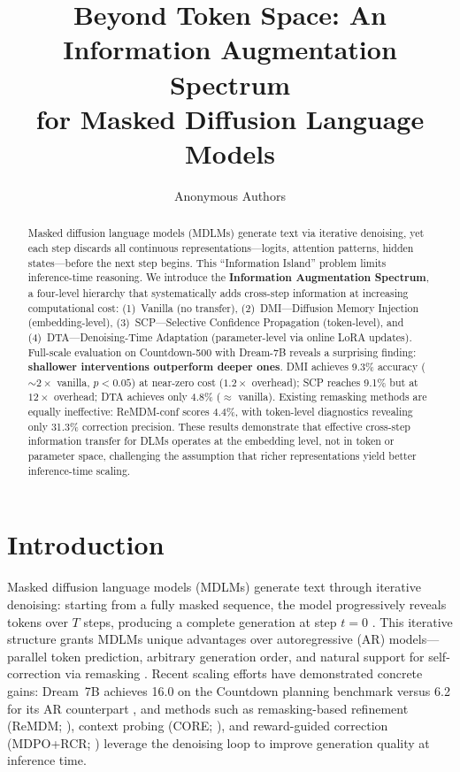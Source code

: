 \documentclass{article}
\title{Beyond Token Space: An Information Augmentation Spectrum\\for Masked Diffusion Language Models}
\author{
  Anonymous Authors
}
\begin{document}
\maketitle

\begin{abstract}
Masked diffusion language models (MDLMs) generate text via iterative denoising, yet each step discards all continuous representations---logits, attention patterns, hidden states---before the next step begins.
This ``Information Island'' problem limits inference-time reasoning.
We introduce the \textbf{Information Augmentation Spectrum}, a four-level hierarchy that systematically adds cross-step information at increasing computational cost:
(1)~Vanilla (no transfer),
(2)~DMI---Diffusion Memory Injection (embedding-level),
(3)~SCP---Selective Confidence Propagation (token-level), and
(4)~DTA---Denoising-Time Adaptation (parameter-level via online LoRA updates).
Full-scale evaluation on Countdown-500 with Dream-7B reveals a surprising finding: \textbf{shallower interventions outperform deeper ones}.
DMI achieves 9.3\% accuracy (${\sim}2{\times}$ vanilla, $p < 0.05$) at near-zero cost ($1.2{\times}$ overhead);
SCP reaches 9.1\% but at $12{\times}$ overhead;
DTA achieves only 4.8\% ($\approx$ vanilla).
Existing remasking methods are equally ineffective: ReMDM-conf scores 4.4\%, with token-level diagnostics revealing only 31.3\% correction precision.
These results demonstrate that effective cross-step information transfer for DLMs operates at the embedding level, not in token or parameter space, challenging the assumption that richer representations yield better inference-time scaling.
\end{abstract}

\section{Introduction}
\label{sec:intro}

Masked diffusion language models (MDLMs) generate text through iterative denoising: starting from a fully masked sequence, the model progressively reveals tokens over $T$ steps, producing a complete generation at step $t = 0$ \citep{sahoo2024mdlm, nie2025llada, dream2025}. This iterative structure grants MDLMs unique advantages over autoregressive (AR) models---parallel token prediction, arbitrary generation order, and natural support for self-correction via remasking \citep{wang2025remdm, core2026}. Recent scaling efforts have demonstrated concrete gains: Dream~7B achieves 16.0 on the Countdown planning benchmark versus 6.2 for its AR counterpart \citep{dream2025}, and methods such as remasking-based refinement (ReMDM; \citealp{wang2025remdm}), context probing (CORE; \citealp{core2026}), and reward-guided correction (MDPO+RCR; \citealp{mdpo2025}) leverage the denoising loop to improve generation quality at inference time.
\end{document}

